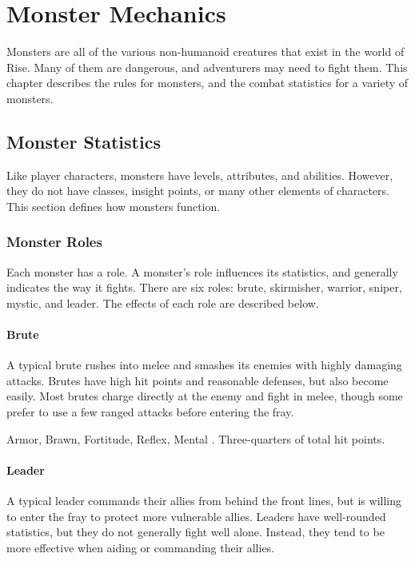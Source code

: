 \chapter{Monster Mechanics}

Monsters are all of the various non-humanoid creatures that exist in the world of Rise.
Many of them are dangerous, and adventurers may need to fight them.
This chapter describes the rules for monsters, and the combat statistics for a variety of monsters.

\section{Monster Statistics}
  Like player characters, monsters have levels, attributes, and abilities.
  However, they do not have classes, insight points, or many other elements of characters.
  This section defines how monsters function.

  \subsection{Monster Roles}
    Each monster has a role.
    A monster's role influences its statistics, and generally indicates the way it fights.
    There are six roles: brute, skirmisher, warrior, sniper, mystic, and leader.
    The effects of each role are described below.

    \subsubsection{Brute}
      A typical brute rushes into melee and smashes its enemies with highly damaging attacks.
      Brutes have high hit points and reasonable defenses, but also become  easily.
      Most brutes charge directly at the enemy and fight in melee, though some prefer to use a few ranged attacks before entering the fray.

        Armor,  Brawn,  Fortitude,  Reflex,  Mental
       .
       Three-quarters of total hit points.

    \subsubsection{Leader}
      A typical leader commands their allies from behind the front lines, but is willing to enter the fray to protect more vulnerable allies.
      Leaders have well-rounded statistics, but they do not generally fight well alone.
      Instead, they tend to be more effective when aiding or commanding their allies.

